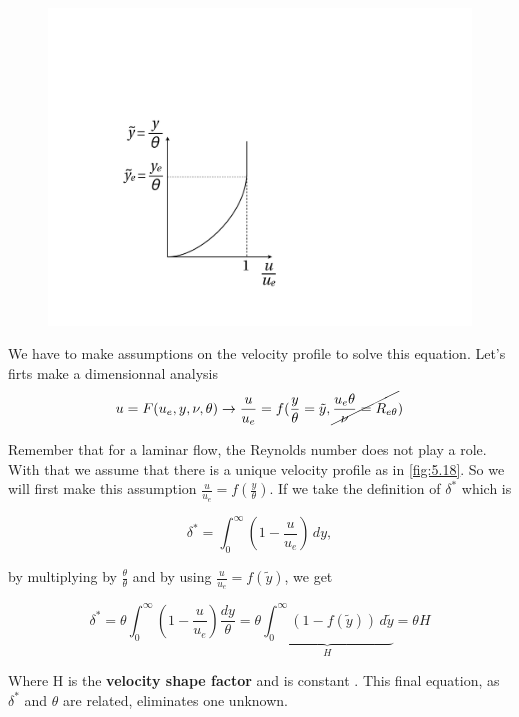 \begin{figure}
\vspace{-5mm}
\includegraphics[scale=0.25]{ch5/19}
\label{fig:5.18}
\end{figure}
We have to make assumptions on the velocity profile to solve this equation. Let's firts make a dimensionnal analysis
\begin{equation}
u=F(u_e,y,\nu,\theta) \rightarrow \frac{u}{u_e}=f(\frac{y}{\theta}=\tilde{y},\cancel{\frac{u_e \theta}{\nu}=R_{e \theta}})
\end{equation}

Remember that for a laminar flow, the Reynolds number does not play a role. With that we assume that there is a unique velocity profile as in \autoref{fig:5.18}. So we will first make this assumption $\frac{u}{u_e} = f\left(\frac{y}{\theta}\right)$. If we take the definition of $\delta ^*$ which is

\begin{equation}
\delta^*=\int_0^\infty (1-\frac{u}{u_e}) \, dy,
\end{equation}

by multiplying by $\frac{\theta}{\theta}$ and by using $\frac{u}{u_e}=f(\tilde{y})$, we get

\begin{equation}
\delta^*=\theta \int_0^\infty (1-\frac{u}{u_e}) \frac{d y}{\theta}=\theta \underbrace{\int_0^\infty (1-f(\tilde{y})) \, d \tilde{y}}_{H} = \theta H
\end{equation}

Where H is the \textbf{velocity shape factor} and is constant . This final equation, as $\delta ^*$ and $\theta$ are related, eliminates one unknown.

